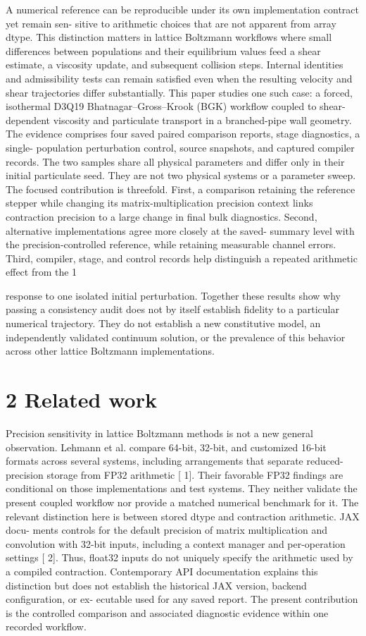 \documentclass[11pt]{article}
\begin{document}
A numerical reference can be reproducible under its own implementation contract yet remain sen-
sitive to arithmetic choices that are not apparent from array dtype. This distinction matters in
lattice Boltzmann workflows where small differences between populations and their equilibrium
values feed a shear estimate, a viscosity update, and subsequent collision steps. Internal identities
and admissibility tests can remain satisfied even when the resulting velocity and shear trajectories
differ substantially.
This paper studies one such case: a forced, isothermal D3Q19 Bhatnagar–Gross–Krook (BGK)
workflow coupled to shear-dependent viscosity and particulate transport in a branched-pipe wall
geometry. The evidence comprises four saved paired comparison reports, stage diagnostics, a single-
population perturbation control, source snapshots, and captured compiler records. The two samples
share all physical parameters and differ only in their initial particulate seed. They are not two
physical systems or a parameter sweep.
The focused contribution is threefold. First, a comparison retaining the reference stepper while
changing its matrix-multiplication precision context links contraction precision to a large change
in final bulk diagnostics. Second, alternative implementations agree more closely at the saved-
summary level with the precision-controlled reference, while retaining measurable channel errors.
Third, compiler, stage, and control records help distinguish a repeated arithmetic effect from the
1

response to one isolated initial perturbation. Together these results show why passing a consistency
audit does not by itself establish fidelity to a particular numerical trajectory. They do not establish
a new constitutive model, an independently validated continuum solution, or the prevalence of this
behavior across other lattice Boltzmann implementations.

\section*{2 Related work}

Precision sensitivity in lattice Boltzmann methods is not a new general observation. Lehmann
et al. compare 64-bit, 32-bit, and customized 16-bit formats across several systems, including
arrangements that separate reduced-precision storage from FP32 arithmetic [ 1]. Their favorable
FP32 findings are conditional on those implementations and test systems. They neither validate
the present coupled workflow nor provide a matched numerical benchmark for it.
The relevant distinction here is between stored dtype and contraction arithmetic. JAX docu-
ments controls for the default precision of matrix multiplication and convolution with 32-bit inputs,
including a context manager and per-operation settings [ 2]. Thus, float32 inputs do not uniquely
specify the arithmetic used by a compiled contraction. Contemporary API documentation explains
this distinction but does not establish the historical JAX version, backend configuration, or ex-
ecutable used for any saved report. The present contribution is the controlled comparison and
associated diagnostic evidence within one recorded workflow.
\end{document}

